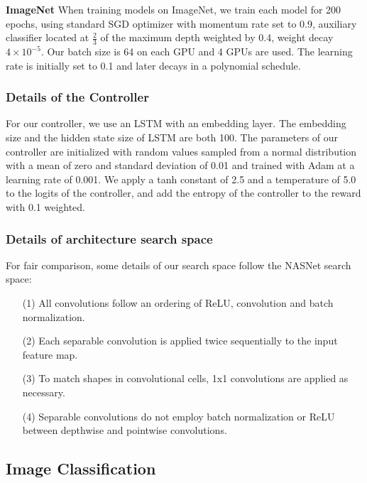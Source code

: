 \documentclass[10pt,twocolumn,letterpaper]{article}
\begin{document}
\noindent
\textbf{ImageNet} \quad
When training models on ImageNet, we train each model for 200 epochs, using standard SGD optimizer with momentum rate set to 0.9, auxiliary classifier located at $\frac{2}{3}$ of the maximum depth weighted by 0.4, weight decay $4\times10^{-5}$. Our batch size is 64 on each GPU and 4 GPUs are used. The learning rate is initially set to 0.1 and later decays in a polynomial schedule.

\subsubsection{Details of the Controller}
For our controller, we use an LSTM with an embedding layer. The embedding size and the hidden state size of LSTM are both 100. The parameters of our controller are initialized with random values sampled from a normal distribution with a mean of zero and standard deviation of 0.01 and trained with Adam at a learning rate of 0.001. We apply a tanh constant of 2.5 and a temperature of 5.0 to the logits of the controller, and add the entropy of the controller to the reward with 0.1 weighted.

\subsubsection{Details of architecture search space}
For fair comparison, some details of our search space follow the NASNet search space: 
\begin{itemize}
\item[(1)] All convolutions follow an ordering of ReLU, convolution and batch normalization. 
\item[(2)] Each separable convolution is applied twice sequentially to the input feature map. 
\item[(3)] To match shapes in convolutional cells, 1x1 convolutions are applied as necessary. 
\item[(4)] Separable convolutions do not employ batch normalization or ReLU between depthwise and pointwise convolutions.
\end{itemize}

\subsection{Image Classification}
\label{5.2}
\end{document}
